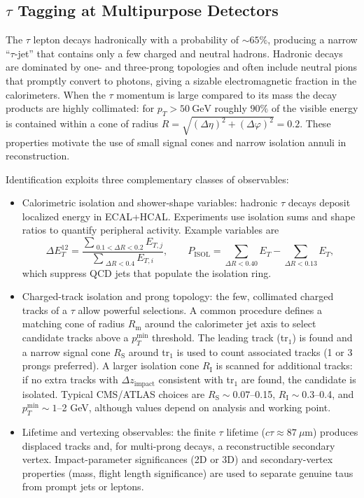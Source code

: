 \subsection{$\tau$ Tagging at Multipurpose Detectors}

The $\tau$ lepton decays hadronically with a probability of $\sim65\%$, producing a narrow ``$\tau$-jet'' that contains only a few charged and neutral hadrons. Hadronic decays are dominated by one- and three-prong topologies and often include neutral pions that promptly convert to photons, giving a sizable electromagnetic fraction in the calorimeters. When the $\tau$ momentum is large compared to its mass the decay products are highly collimated: for $p_T>50\ \mathrm{GeV}$ roughly $90\%$ of the visible energy is contained within a cone of radius $R=\sqrt{(\Delta\eta)^2+(\Delta\varphi)^2}=0.2$. These properties motivate the use of small signal cones and narrow isolation annuli in reconstruction.

Identification exploits three complementary classes of observables:

\begin{itemize}
  \item Calorimetric isolation and shower-shape variables: hadronic $\tau$ decays deposit localized energy in ECAL+HCAL. Experiments use isolation sums and shape ratios to quantify peripheral activity. Example variables are
  \[
    \Delta E_T^{12}=\frac{\sum_{\;0.1<\Delta R<0.2} E_{T,j}}{\sum_{\;\Delta R<0.4} E_{T,i}},\qquad
    P_{\mathrm{ISOL}}=\sum_{\Delta R<0.40}E_T - \sum_{\Delta R<0.13}E_T,
  \]
  which suppress QCD jets that populate the isolation ring.
  \item Charged-track isolation and prong topology: the few, collimated charged tracks of a $\tau$ allow powerful selections. A common procedure defines a matching cone of radius $R_{\mathrm{m}}$ around the calorimeter jet axis to select candidate tracks above a $p_T^{\min}$ threshold. The leading track (tr$_1$) is found and a narrow signal cone $R_{\mathrm{S}}$ around tr$_1$ is used to count associated tracks (1 or 3 prongs preferred). A larger isolation cone $R_{\mathrm{I}}$ is scanned for additional tracks: if no extra tracks with $\Delta z_{\text{impact}}$ consistent with tr$_1$ are found, the candidate is isolated. Typical CMS/ATLAS choices are $R_{\mathrm{S}}\sim0.07$–0.15, $R_{\mathrm{I}}\sim0.3$–0.4, and $p_T^{\min}\sim1$–2 GeV, although values depend on analysis and working point.
  \item Lifetime and vertexing observables: the finite $\tau$ lifetime ($c\tau\approx87\ \mu\mathrm{m}$) produces displaced tracks and, for multi-prong decays, a reconstructible secondary vertex. Impact-parameter significances (2D or 3D) and secondary-vertex properties (mass, flight length significance) are used to separate genuine taus from prompt jets or leptons.
\end{itemize}

